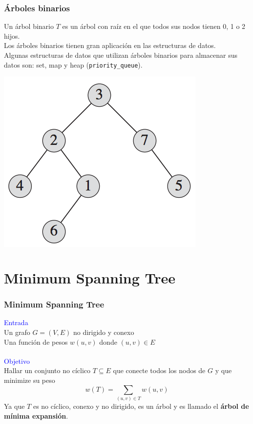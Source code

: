 \documentclass{beamer}
\begin{document}
	\begin{frame}[fragile]
		\frametitle{Árboles binarios}
		Un árbol binario $T$ es un árbol con raíz en el que todos sus nodos tienen 0, 1 o 2 hijos.\\
		Los árboles binarios tienen gran aplicación en las estructuras de datos.\\
		Algunas estructuras de datos que utilizan árboles binarios para almacenar sus datos son: set, map y heap (\verb|priority_queue|).
		\begin{center} \includegraphics[height = 0.4\textheight]{BinaryTree.png}  \end{center}
	\end{frame}


\section[MST]{Minimum Spanning Tree}
	\begin{frame}
		\frametitle{Minimum Spanning Tree}
		\textcolor{blue}{\large Entrada}\\
		Un grafo $G = (V, E)$ no dirigido y conexo\\ 
		Una función de pesos $w(u, v)$ donde $(u, v) \in E$ \\ \quad \\
		\textcolor{blue}{\large Objetivo}\\
		Hallar un conjunto no cíclico $T \subseteq E$ que conecte todos los nodos de $G$ y que minimize su peso
		$$w(T) = \sum_{(u, v) \in T}{w(u, v)}$$
		Ya que $T$ es no cíclico, conexo y no dirigido, es un árbol y es llamado el \textbf{árbol de mínima expansión}.
	\end{frame}
		
\end{document}
